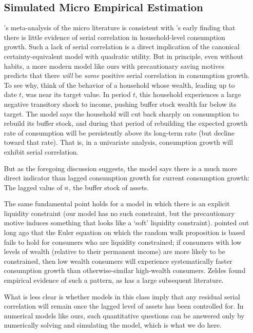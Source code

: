\subsection{Simulated Micro Empirical Estimation} \label{subsec:simMicro}

\cite{hrsHabit}'s meta-analysis of the micro literature is consistent with \cite{dynanHabits}'s early finding that there is little evidence of serial correlation in household-level consumption growth.  Such a lack of serial correlation is a direct implication of the canonical \cite{hallRandomWalk} certainty-equivalent model with quadratic utility.  But in principle, even without habits, a more modern model like ours with precautionary saving motives predicts that there {\it will} be {\it some} positive serial correlation in consumption growth.  To see why, think of the behavior of a household whose wealth, leading up to date $t$, was near its target value.
In period $t$, this household experiences a large negative transitory shock to income, pushing buffer stock wealth far below its target.  The model says the household will cut back sharply on consumption to rebuild its buffer stock, and during that period of rebuilding the expected growth rate of consumption will be persistently above its long-term rate (but decline toward that rate).  That is, in a univariate analysis, consumption growth will exhibit serial correlation.

But as the foregoing discussion suggests, the model says there is a much more direct indicator than lagged consumption growth for current consumption growth:  The lagged value of $a$, the buffer stock of assets.

The same fundamental point holds for a model in which there is an explicit liquidity constraint (our model has no such constraint, but the precautionary motive induces something that looks like a `soft' liquidity constraint).  \cite{zeldes:jpe} pointed out long ago that the Euler equation on which the random walk proposition is based fails to hold for consumers who are liquidity constrained; if consumers with low levels of wealth (relative to their permanent income) are more likely to be constrained, then low wealth consumers will experience systematically faster consumption growth than otherwise-similar high-wealth consumers.  Zeldes found empirical evidence of such a pattern, as has a large subsequent literature.

What is less clear is whether models in this class imply that any residual serial correlation will remain once the lagged level of assets has been controlled for.  In numerical models like ours, such quantitative questions can be answered only by numerically solving and simulating the model, which is what we do here.

